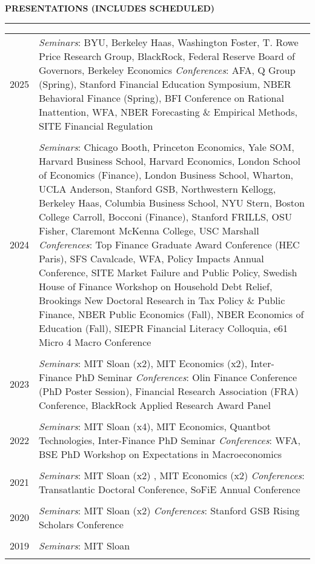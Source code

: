\documentclass[a4paper, 10pt]{article}
\newcommand{\cvsec}[1]
{
	\needspace{2\baselineskip}
	\noindent \textbf{#1}
	
	\vspace{2pt}
	
	\hrule
	
	\bigskip
}
\newcommand{\cvitem}[2]{#1 & #2 \\ & \\}
\newenvironment{cvchrono}[1]
{
	\cvsec{#1}
	\begin{tabu} to \linewidth {X[1,l]X[6,l]} 
}
{
	\end{tabu}
}
\begin{document}
\begin{cvchrono}{PRESENTATIONS (INCLUDES SCHEDULED)}
	\cvitem{2025}{\textit{Seminars}: BYU, Berkeley Haas, Washington Foster, T. Rowe Price Research Group, BlackRock, Federal Reserve Board of Governors, Berkeley Economics  \newline \textit{Conferences}: AFA, Q Group (Spring), Stanford Financial Education Symposium, NBER Behavioral Finance (Spring), BFI Conference on Rational Inattention, WFA, NBER Forecasting \& Empirical Methods, SITE Financial Regulation}
	\cvitem{2024}{\textit{Seminars}: Chicago Booth, Princeton Economics, Yale SOM, Harvard Business School, Harvard Economics, London School of Economics (Finance), London Business School, Wharton, UCLA Anderson, Stanford GSB, Northwestern Kellogg, Berkeley Haas, Columbia Business School, NYU Stern, Boston College Carroll, Bocconi (Finance), Stanford FRILLS, OSU Fisher, Claremont McKenna College, USC Marshall \newline \textit{Conferences}: Top Finance Graduate Award Conference (HEC Paris), SFS Cavalcade, WFA, Policy Impacts Annual Conference, SITE Market Failure and Public Policy, Swedish House of Finance Workshop on Household Debt Relief, Brookings New Doctoral Research in Tax Policy \& Public Finance, NBER Public Economics (Fall), NBER Economics of Education (Fall), SIEPR Financial Literacy Colloquia, e61 Micro 4 Macro Conference}
	\cvitem{2023}{\textit{Seminars}: MIT Sloan (x2), MIT Economics (x2), Inter-Finance PhD Seminar \newline \textit{Conferences}: Olin Finance Conference (PhD Poster Session), Financial Research Association (FRA) Conference, BlackRock Applied Research Award Panel}
	\cvitem{2022}{\textit{Seminars}: MIT Sloan (x4), MIT Economics, Quantbot Technologies, Inter-Finance PhD Seminar \newline \textit{Conferences}: WFA, BSE PhD Workshop on Expectations in Macroeconomics}
	\cvitem{2021}{\textit{Seminars}: MIT Sloan (x2) , MIT Economics (x2) \newline \textit{Conferences}: Transatlantic Doctoral Conference, SoFiE Annual Conference}
	\cvitem{2020}{\textit{Seminars}: MIT Sloan (x2) \newline \textit{Conferences}: Stanford GSB Rising Scholars Conference}
	\cvitem{2019}{\textit{Seminars}: MIT Sloan}
\end{cvchrono}

\end{document}
